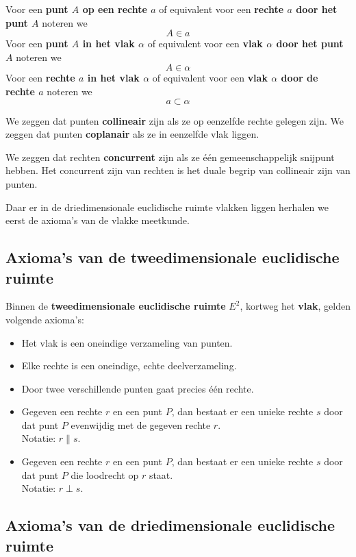 \documentclass[12pt,twoside]{article}
\begin{document}
Voor een {\bf punt $A$ op een rechte $a$} of equivalent voor een {\bf rechte $a$ door het punt $A$} noteren we $$A\in a$$
Voor een {\bf punt $A$ in het vlak $\alpha$} of equivalent voor een {\bf vlak $\alpha$ door het punt $A$} noteren we $$A\in \alpha$$
Voor een {\bf rechte $a$ in het vlak $\alpha$} of equivalent voor een {\bf vlak $\alpha$ door de rechte $a$} noteren we $$a\subset \alpha$$

We zeggen dat punten {\bf collineair} zijn als ze op eenzelfde rechte gelegen zijn. We zeggen dat punten {\bf coplanair} als ze in eenzelfde vlak liggen.

We zeggen dat rechten {\bf concurrent} zijn als ze één gemeenschappelijk snijpunt hebben. Het concurrent zijn van rechten is het duale begrip van collineair zijn van punten.

Daar er in de driedimensionale euclidische ruimte vlakken liggen herhalen we eerst de axioma's van de vlakke meetkunde.

\subsection{Axioma's van de tweedimensionale euclidische ruimte}

Binnen de {\bf tweedimensionale euclidische ruimte} $E^2$, kortweg het {\bf vlak}, gelden volgende axioma's:
\begin{itemize}
  \item Het vlak is een oneindige verzameling van punten.
  \item Elke rechte is een oneindige, echte deelverzameling.
  \item Door twee verschillende punten gaat precies één rechte.
  \item Gegeven een rechte $r$ en een punt $P$, dan bestaat er een unieke rechte $s$ door dat punt $P$ evenwijdig met de gegeven rechte $r$.\\
  Notatie: $r\parallel s$.
  \item Gegeven een rechte $r$ en een punt $P$, dan bestaat er een unieke rechte $s$ door dat punt $P$ die loodrecht op $r$ staat.\\
  Notatie: $r\perp s$.
\end{itemize}

\subsection{Axioma's van de driedimensionale euclidische ruimte}
\end{document}
